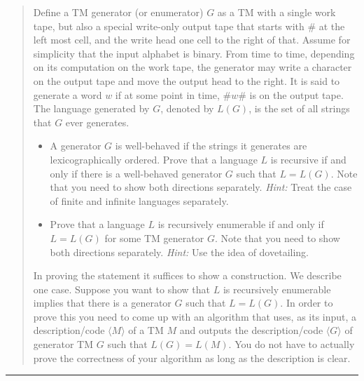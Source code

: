 \documentclass[11pt]{article}
\begin{document}
\begin{quote}
Define a TM generator (or enumerator) $G$ as a TM with a single
  work tape, but also a special write-only output tape that starts
  with $\#$ at the left most cell, and the write head one cell to the
  right of that.  Assume for simplicity that the input alphabet is
  binary.  From time to time, depending on its computation on the work
  tape, the generator may write a character on the output tape and
  move the output head to the right.  It is said to generate a word
  $w$ if at some point in time, $\#w\#$ is on the output tape. The
  language generated by $G$, denoted by $L(G)$, is the set of all
  strings that $G$ ever generates.
  \begin{itemize}
  \item A generator $G$ is well-behaved if the strings it generates
    are lexicographically ordered. Prove that a language $L$ is
    recursive if and only if there is a well-behaved generator $G$ such
    that $L=L(G)$. Note that you need
    to show both directions separately. {\em Hint:} Treat the case of finite and
    infinite languages separately.

  \item Prove that a language $L$ is recursively enumerable if and
    only if $L = L(G)$ for some TM generator $G$. Note that you need
    to show both directions separately. {\em Hint:} Use the idea of
    dovetailing.
  \end{itemize}
  In proving the statement it suffices to show a construction. We
  describe one case. Suppose you want to show that $L$ is recursively
  enumerable implies that there is a generator $G$ such that
  $L = L(G)$. In order to prove this you need to come up with an
  algorithm that uses, as its input, a description/code
  $\langle M \rangle$ of a TM $M$ and outputs the description/code
  $\langle G \rangle$ of generator TM $G$ such that $L(G) = L(M)$.  You
  do not have to actually prove the correctness of your algorithm as long as
  the description is clear.
\end{quote}
\hrule
\end{document}
